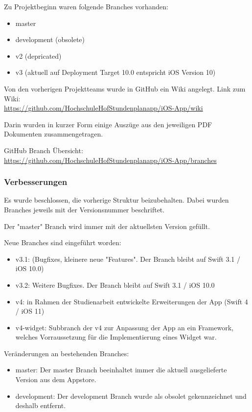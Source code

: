 Zu Projektbeginn waren folgende Branches vorhanden:
\begin{itemize}
\item master
\item development (obsolete)
\item v2 (depricated)
\item v3 (aktuell auf Deployment Target 10.0 entspricht iOS Version 10)
\end{itemize}


Von den vorherigen Projektteams wurde in GitHub ein Wiki angelegt.
Link zum Wiki:\\
\url{https://github.com/HochschuleHofStundenplanapp/iOS-App/wiki}

Darin wurden in kurzer Form einige Auszüge aus den jeweiligen PDF Dokumenten zusammengetragen.




GitHub Branch Übersicht:\\
 \url{https://github.com/HochschuleHofStundenplanapp/iOS-App/branches}

\subsubsection{Verbesserungen}
Es wurde beschlossen, die vorherige Struktur beizubehalten. Dabei wurden Branches jeweils mit der Versionsnummer beschriftet.

Der "master" Branch wird immer mit der aktuellsten Version gefüllt.

Neue Branches sind eingeführt worden:
\begin{itemize}
\item v3.1: (Bugfixes, kleinere neue "Features". Der Branch bleibt auf Swift 3.1  / iOS 10.0)
\item v3.2: Weitere Bugfixes. Der Branch bleibt auf Swift 3.1  / iOS 10.0 %
\item v4: in Rahmen der Studienarbeit entwickelte Erweiterungen der App (Swift 4 / iOS 11)
\item v4-widget: Subbranch der v4 zur Anpassung der App an ein Framework, welches Vorraussetzung für die Implementierung eines Widget war.
\end{itemize}

Veränderungen an bestehenden Branches:
\begin{itemize}
\item master: Der master Branch beeinhaltet immer die aktuell ausgelieferte Version aus dem Appstore.
\item development: Der development Branch wurde als obsolet gekennzeichnet und deshalb entfernt.
\end{itemize}


